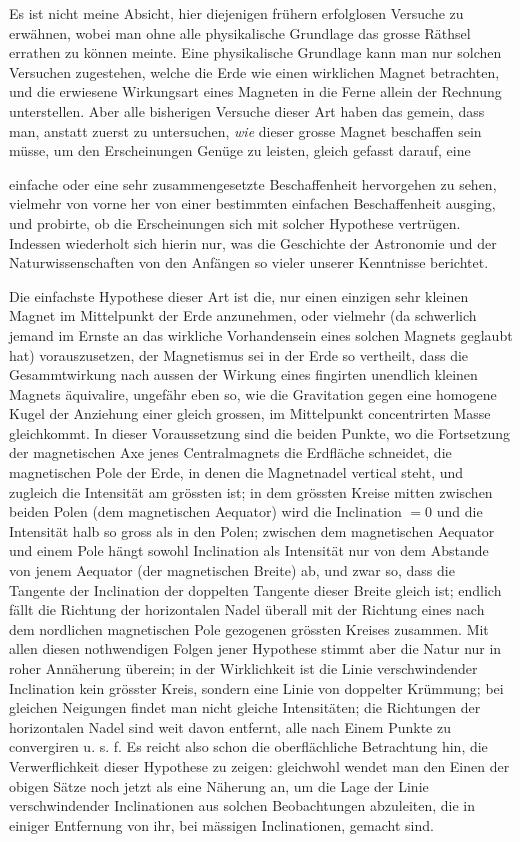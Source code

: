 Es ist nicht meine Absicht, hier diejenigen frühern erfolglosen Versuche zu erwähnen, wobei man ohne alle physikalische Grundlage das grosse Räthsel errathen zu können meinte. Eine physikalische Grundlage kann man nur solchen Versuchen zugestehen, welche die Erde wie einen wirklichen Magnet betrachten, und die erwiesene Wirkungsart eines Magneten in die Ferne allein der Rechnung unterstellen. Aber alle bisherigen Versuche dieser Art haben das gemein, dass man, anstatt zuerst zu untersuchen, \textit{wie} dieser grosse Magnet beschaffen sein müsse, um den Erscheinungen Genüge zu leisten, gleich gefasst darauf, eine \par
\clearpage
{}
\noindent einfache oder eine sehr zusammengesetzte Beschaffenheit hervorgehen zu sehen, vielmehr von vorne her von einer bestimmten einfachen Beschaffenheit ausging, und probirte, ob die Erscheinungen sich mit solcher Hypothese vertrügen. Indessen wiederholt sich hierin nur, was die Geschichte der Astronomie und der Naturwissenschaften von den Anfängen so vieler unserer Kenntnisse berichtet.

Die einfachste Hypothese dieser Art ist die, nur einen einzigen sehr kleinen Magnet im Mittelpunkt der Erde anzunehmen, oder vielmehr (da schwerlich jemand im Ernste an das wirkliche Vorhandensein eines solchen Magnets geglaubt hat) vorauszusetzen, der Magnetismus sei in der Erde so vertheilt, dass die Gesammtwirkung nach aussen der Wirkung eines fingirten unendlich kleinen Magnets äquivalire, ungefähr eben so, wie die Gravitation gegen eine homogene Kugel der Anziehung einer gleich grossen, im Mittelpunkt concentrirten Masse gleichkommt. In dieser Voraussetzung sind die beiden Punkte, wo die Fortsetzung der magnetischen Axe jenes Centralmagnets die Erdfläche schneidet, die magnetischen Pole der Erde, in denen die Magnetnadel vertical steht, und zugleich die Intensität am grössten ist; in dem grössten Kreise mitten zwischen beiden Polen (dem magnetischen Aequator) wird die Inclination $=0$ und die Intensität halb so gross als in den Polen; zwischen dem magnetischen Aequator und einem Pole hängt sowohl Inclination als Intensität nur von dem Abstande von jenem Aequator (der magnetischen Breite) ab, und zwar so, dass die Tangente der Inclination der doppelten Tangente dieser Breite gleich ist; endlich fällt die Richtung der horizontalen Nadel überall mit der Richtung eines nach dem nordlichen magnetischen Pole gezogenen grössten Kreises zusammen. Mit allen diesen nothwendigen Folgen jener Hypothese stimmt aber die Natur nur in roher Annäherung überein; in der Wirklichkeit ist die Linie verschwindender Inclination kein grösster Kreis, sondern eine Linie von doppelter Krümmung; bei gleichen Neigungen findet man nicht gleiche Intensitäten; die Richtungen der horizontalen Nadel sind weit davon entfernt, alle nach Einem Punkte zu convergiren u. s. f. Es reicht also schon die oberflächliche Betrachtung hin, die Verwerflichkeit dieser Hypothese zu zeigen: gleichwohl wendet man den Einen der obigen Sätze noch jetzt als eine Näherung an, um die Lage der Linie verschwindender Inclinationen aus solchen Beobachtungen abzuleiten, die in einiger Entfernung von ihr, bei mässigen Inclinationen, gemacht sind.

